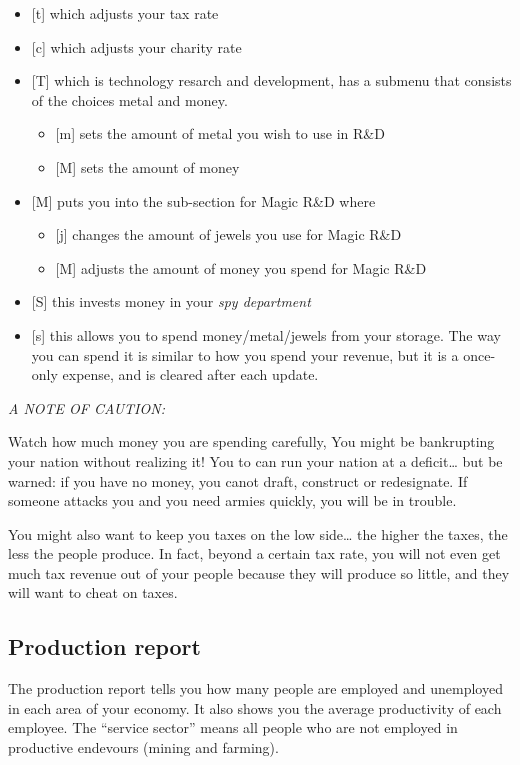 \begin{itemize}
\item
{[t]} which adjusts your tax rate
\item
{[c]} which adjusts your charity rate
\item
{[T]} which is technology resarch and development, has a
submenu that consists of the choices metal and money.
\begin{itemize}
\item
   {[m]} sets the amount of metal you wish to use in R\&D 
\item
   {[M]} sets the amount of money
\end{itemize}
\item
{[M]} puts you into the sub-section for Magic R\&D where
\begin{itemize}
\item
   {[j]} changes the amount of jewels you use for Magic R\&D
\item
   {[M]} adjusts the amount of money you spend for Magic R\&D
\end{itemize}
\item
{[S]} this invests money in your \emph{spy department}
\item
{[s]} this allows you to spend money/metal/jewels from your storage.
The way you can spend it is similar to how you spend your revenue, but
it is a once-only expense, and is cleared after each update.
\end{itemize}

\emph{A NOTE OF CAUTION:}

Watch how much money you are spending carefully, You might be
bankrupting your nation without realizing it!  You to can run your
nation at a deficit\dots{} but be warned:  if you have no money, you
canot draft, construct or redesignate.  If someone attacks you and
you need armies quickly, you will be in trouble.

You might also want to keep you taxes on the low side\dots{} the
higher the taxes, the less the people produce.  In fact, beyond a
certain tax rate, you will not even get much tax revenue out of your
people because they will produce so little, and they will want to
cheat on taxes.

\subsection{Production report}
The production report tells you how many people are employed and
unemployed in each area of your economy.  It also shows you the
average productivity of each employee.  The ``service sector''
means all people who are not employed in productive endevours (mining
and farming).

